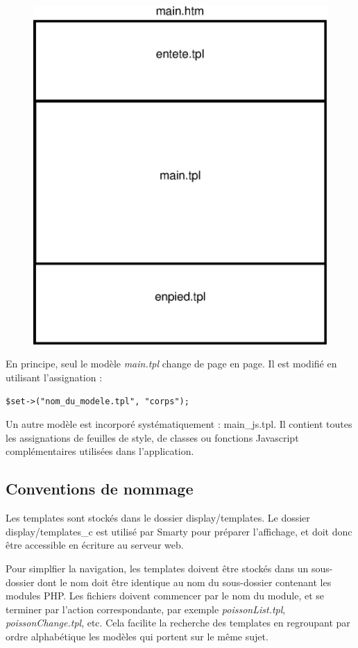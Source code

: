 \begin{figure}[H]
\centering
\includegraphics[width=0.7\linewidth]{dessin/templates}
\caption{}
\end{figure}

En principe, seul le modèle \textit{main.tpl} change de page en page. Il est modifié en utilisant l'assignation :
\begin{lstlisting}
$set->("nom_du_modele.tpl", "corps");
\end{lstlisting}

Un autre modèle est incorporé systématiquement : main\_js.tpl.  Il contient toutes les assignations de feuilles de style, de classes ou fonctions Javascript complémentaires utilisées dans l'application.


\subsection{Conventions de nommage}

Les templates sont stockés dans le dossier display/templates. Le dossier display/templates\_c est utilisé par Smarty pour préparer l'affichage, et doit donc être accessible en écriture au serveur web.

Pour simplfier la navigation, les templates doivent être stockés dans un sous-dossier dont le nom doit être identique au nom du sous-dossier contenant les modules PHP. Les fichiers doivent commencer par le nom du module, et se terminer par l'action correspondante, par exemple \textit{poissonList.tpl}, \textit{poissonChange.tpl}, etc. 
Cela facilite la recherche des templates en regroupant par ordre alphabétique les modèles qui portent sur le même sujet.

